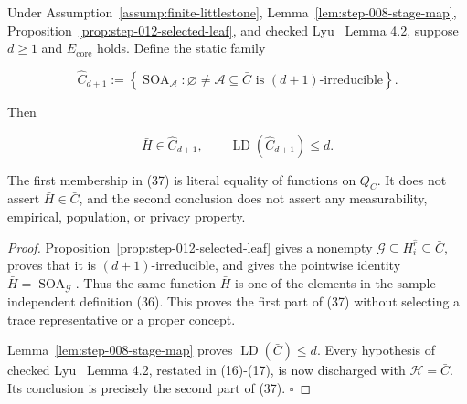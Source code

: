 \begin{proposition}\label{prop:step-012-fixed-family}
Under Assumption~\ref{assump:finite-littlestone}, Lemma~\ref{lem:step-008-stage-map},
Proposition~\ref{prop:step-012-selected-leaf}, and checked Lyu~\citep{lyu2025} Lemma 4.2,
suppose \(d\ge1\) and \(E_{\mathrm{core}}\) holds. Define the static family

\[
 \widehat C_{d+1}
 :=\left\{\operatorname{SOA}_{\mathcal A}:
       \varnothing\ne\mathcal A\subseteq\bar C
       \text{ is }(d+1)\text{-irreducible}\right\}.
\tag{36}
\]

Then

\[
 \bar H\in\widehat C_{d+1},
 \qquad
 \operatorname{LD}(\widehat C_{d+1})\le d.
\tag{37}
\]

The first membership in (37) is literal equality of functions on \(Q_C\).
It does not assert \(\bar H\in\bar C\), and the second conclusion does not
assert any measurability, empirical, population, or privacy property.


\end{proposition}

\begin{proof}
Proposition~\ref{prop:step-012-selected-leaf} gives a nonempty
\(\mathcal G\subseteq H_i^{\widehat r}\subseteq\bar C\), proves that it
is \((d+1)\)-irreducible, and gives the pointwise identity
\(\bar H=\operatorname{SOA}_{\mathcal G}\). Thus the same function
\(\bar H\) is one of the elements in the sample-independent definition
(36). This proves the first part of (37) without selecting a trace
representative or a proper concept.

Lemma~\ref{lem:step-008-stage-map} proves
\(\operatorname{LD}(\bar C)\le d\). Every hypothesis of checked Lyu~\citep{lyu2025}
Lemma 4.2, restated in (16)-(17), is now discharged with
\(\mathcal H=\bar C\). Its conclusion is precisely the second part of
(37). \(\square\)


\end{proof}

